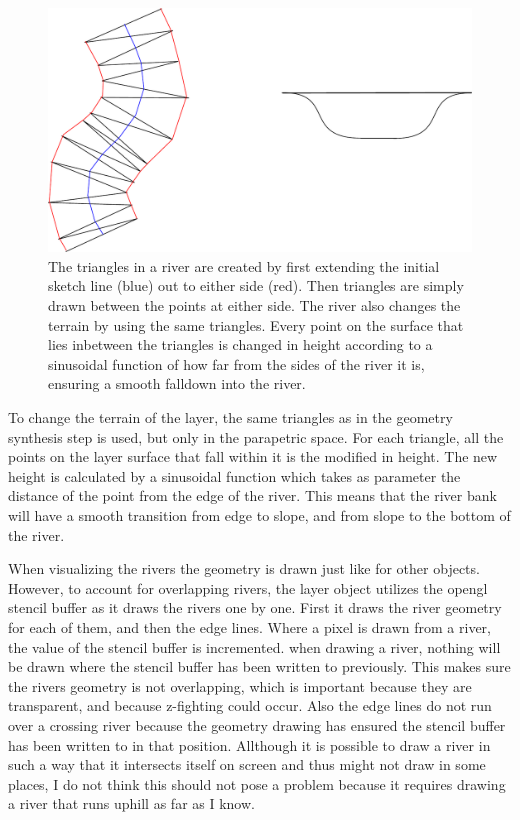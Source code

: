\documentclass[a4paper,12pt]{report}
\begin{document}
\begin{figure}
\centering
\includegraphics[width=.7\linewidth]{thesis/riverTriangles.pdf}
 \caption{The triangles in a river are created by first extending the initial sketch line (blue) out to either side (red). Then triangles are simply drawn between the points at either side. The river also changes the terrain by using the same triangles. Every point on the surface that lies inbetween the triangles is changed in height according to a sinusoidal function of how far from the sides of the river it is, ensuring a smooth falldown into the river. }
 \label{fig:riverTriangles}
\end{figure}

To change the terrain of the layer, the same triangles as in the geometry synthesis step is used, but only in the parapetric space. For each triangle, all the points on the layer surface that fall within it is the modified in height. The new height is calculated by a sinusoidal function which takes as parameter the distance of the point from the edge of the river. This means that the river bank will have a smooth transition from edge to slope, and from slope to the bottom of the river.

When visualizing the rivers the geometry is drawn just like for other objects. However, to account for overlapping rivers, the layer object utilizes the opengl stencil buffer as it draws the rivers one by one. First it draws the river geometry for each of them, and then the edge lines. Where a pixel is drawn from a river, the value of the stencil buffer is incremented. when drawing a river, nothing will be drawn where the stencil buffer has been written to previously. This makes sure the rivers geometry is not overlapping, which is important because they are transparent, and because z-fighting could occur. Also the edge lines do not run over a crossing river because the geometry drawing has ensured the stencil buffer has been written to in that position. Allthough it is possible to draw a river in such a way that it intersects itself on screen and thus might not draw in some places, I do not think this should not pose a problem because it requires drawing a river that runs uphill as far as I know.
\end{document}
